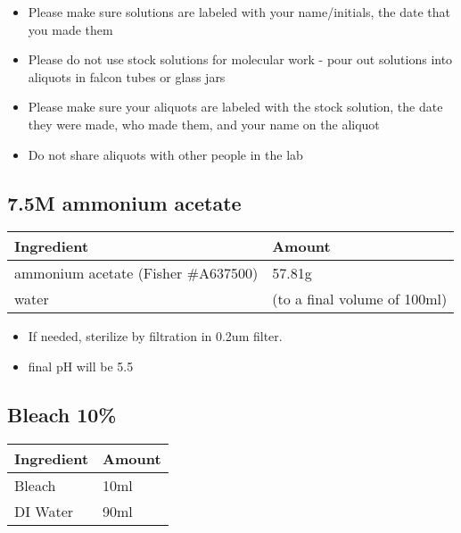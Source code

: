 \documentclass[
  letterpaper,
  DIV=11,
  numbers=noendperiod]{scrreprt}
\begin{document}
\begin{itemize}
\item
  Please make sure solutions are labeled with your name/initials, the
  date that you made them
\item
  Please do not use stock solutions for molecular work - pour out
  solutions into aliquots in falcon tubes or glass jars
\item
  Please make sure your aliquots are labeled with the stock solution,
  the date they were made, who made them, and your name on the aliquot
\item
  Do not share aliquots with other people in the lab
\end{itemize}

\hypertarget{m-ammonium-acetate}{%
\subsection*{\texorpdfstring{\textbf{7.5M ammonium
acetate}}{7.5M ammonium acetate}}\label{m-ammonium-acetate}}

\begin{longtable}[]{@{}ll@{}}
\toprule()
\textbf{Ingredient} & \textbf{Amount} \\
\midrule()
\endhead
ammonium acetate (Fisher \#A637500) & 57.81g \\
water & (to a final volume of 100ml) \\
\bottomrule()
\end{longtable}

\begin{itemize}
\item
  If needed, sterilize by filtration in 0.2um filter.
\item
  final pH will be 5.5
\end{itemize}

\hypertarget{bleach-10}{%
\subsection*{\texorpdfstring{\textbf{Bleach
10\%}}{Bleach 10\%}}\label{bleach-10}}

\begin{longtable}[]{@{}ll@{}}
\toprule()
\textbf{Ingredient} & \textbf{Amount} \\
\midrule()
\endhead
Bleach & 10ml \\
DI Water & 90ml \\
\bottomrule()
\end{longtable}
\end{document}
